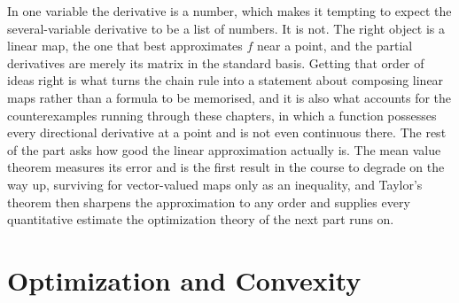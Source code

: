 \documentclass{report}
\theoremstyle{purplethm}
\theoremstyle{purplethm}
\theoremstyle{defthm}
\theoremstyle{examplethm}
\theoremstyle{questionthm}
\theoremstyle{remarkthm}
\theoremstyle{asidethm}
\theoremstyle{importantremarkthm}
\theoremstyle{remarkthm}
\theoremstyle{ainotethm}
\theoremstyle{purplethm}
\begin{document}
In one variable the derivative is a number, which makes it tempting to expect the several-variable
derivative to be a list of numbers. It is not. The right object is a linear map, the one that best
approximates $f$ near a point, and the partial derivatives are merely its matrix in the standard
basis. Getting that order of ideas right is what turns the chain rule into a statement about
composing linear maps rather than a formula to be memorised, and it is also what accounts for the
counterexamples running through these chapters, in which a function possesses every directional
derivative at a point and is not even continuous there. The rest of the part asks how good the
linear approximation actually is. The mean value theorem measures its error and is the first
result in the course to degrade on the way up, surviving for vector-valued maps only as an
inequality, and Taylor's theorem then sharpens the approximation to any order and supplies every
quantitative estimate the optimization theory of the next part runs on.





\part{Optimization and Convexity}
\end{document}
